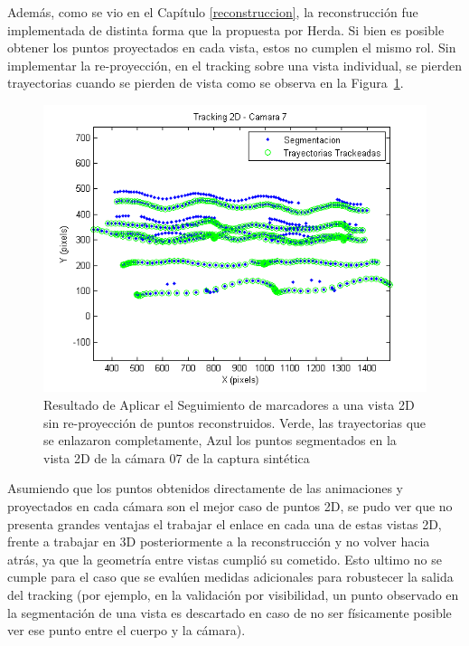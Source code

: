 Además, como se vio en el Capítulo \ref{reconstruccion}, la reconstrucción fue implementada de distinta forma que la propuesta por Herda. Si bien es posible obtener los puntos proyectados en cada vista, estos no cumplen el mismo rol. Sin implementar la re-proyección, en el tracking sobre una vista individual, se pierden trayectorias cuando se pierden de vista como se observa en la Figura~\ref{tracking_2D_cam_07}.
\vspace{-0.2cm}
\begin{figure}[H]
\begin{center}
\includegraphics[scale=0.7]{img/Tracking/011_tracking_2D_camara_07.png}
\end{center}
\vspace{-0.8cm}
\caption{Resultado de Aplicar el Seguimiento de marcadores a una vista 2D sin re-proyección de puntos reconstruidos. Verde, las trayectorias que se enlazaron completamente, Azul los puntos segmentados en la vista 2D de la cámara 07 de la captura sintética}
\label{tracking_2D_cam_07}
\end{figure}

Asumiendo que los puntos obtenidos directamente de las animaciones y proyectados en cada cámara son el mejor caso de puntos 2D, se pudo ver que no presenta grandes ventajas el trabajar el enlace en cada una de estas vistas 2D, frente a trabajar en 3D posteriormente a la reconstrucción y no volver hacia atrás, ya que la geometría entre vistas cumplió su cometido. Esto ultimo no se cumple para el caso que se evalúen medidas adicionales para robustecer la salida del tracking (por ejemplo, en la validación por visibilidad, un punto observado en la segmentación de una vista es descartado en caso de no ser físicamente posible ver ese punto entre el cuerpo y la cámara).

